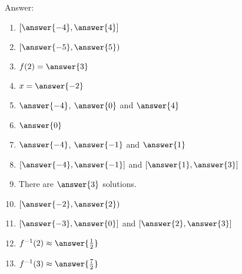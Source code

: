 \documentclass{ximera}
\begin{document}
\begin{exercise}
Answer:

\begin{multicols}{2}
\begin{enumerate}
\item  $[\answer{-4},\answer{4}]$
\item  $[\answer{-5},\answer{5})$
\item  $f(2)=\answer{3}$
\item  $x=\answer{-2}$
\item  $\answer{-4}$, $\answer{0}$ and $\answer{4}$
\item  $\answer{0}$
\item  $\answer{-4}$, $\answer{-1}$ and $\answer{1}$
\item  $[\answer{-4},\answer{-1}]$ and $[\answer{1},\answer{3}]$
\item  There are $\answer{3}$ solutions.
\item  $[\answer{-2},\answer{2})$
\item  $[\answer{-3},\answer{0}]$ and $[\answer{2},\answer{3}]$
\item  $f^{-1}(2)\approx\answer{\frac{1}{2}}$
\item  $f^{-1}(3)\approx\answer{\frac{7}{2}}$
\end{enumerate}
\end{multicols}

\end{exercise}
\end{document}
